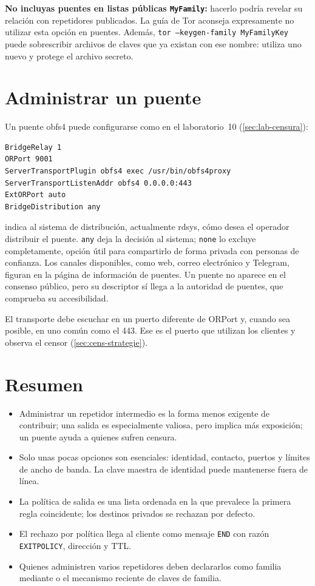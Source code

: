 \textbf{No incluyas puentes en listas públicas \texttt{MyFamily}:} hacerlo podría revelar su relación con repetidores publicados. La guía de Tor aconseja expresamente no utilizar esta opción en puentes. Además, \texttt{tor --keygen-family MyFamilyKey} puede sobrescribir archivos de claves que ya existan con ese nombre: utiliza uno nuevo y protege el archivo secreto.

\section{Administrar un puente}\label{sec:relay-bridge}

Un puente obfs4 puede configurarse como en el laboratorio~10 (\cref{sec:lab-censura}):
\begin{lstlisting}[numbers=none]
BridgeRelay 1
ORPort 9001
ServerTransportPlugin obfs4 exec /usr/bin/obfs4proxy
ServerTransportListenAddr obfs4 0.0.0.0:443
ExtORPort auto
BridgeDistribution any
\end{lstlisting}

 indica al sistema de distribución, actualmente rdsys, cómo desea el operador distribuir el puente. \texttt{any} deja la decisión al sistema; \texttt{none} lo excluye completamente, opción útil para compartirlo de forma privada con personas de confianza. Los canales disponibles, como web, correo electrónico y Telegram, figuran en la página de información de puentes. Un puente no aparece en el consenso público, pero su descriptor sí llega a la autoridad de puentes, que comprueba su accesibilidad.

El transporte debe escuchar en un puerto diferente de ORPort y, cuando sea posible, en uno común como el 443. Ese es el puerto que utilizan los clientes y observa el censor (\cref{sec:cens-strategie}).

\section*{Resumen}
\begin{itemize}
  \item Administrar un repetidor intermedio es la forma menos exigente de contribuir; una salida es especialmente valiosa, pero implica más exposición; un puente ayuda a quienes sufren censura.
  \item Solo unas pocas opciones son esenciales: identidad, contacto, puertos y límites de ancho de banda. La clave maestra de identidad puede mantenerse fuera de línea.
  \item La política de salida es una lista ordenada en la que prevalece la primera regla coincidente; los destinos privados se rechazan por defecto.
  \item El rechazo por política llega al cliente como mensaje \texttt{END} con razón \texttt{EXITPOLICY}, dirección y TTL.
  \item Quienes administren varios repetidores deben declararlos como familia mediante  o el mecanismo reciente de claves de familia.
\end{itemize}

